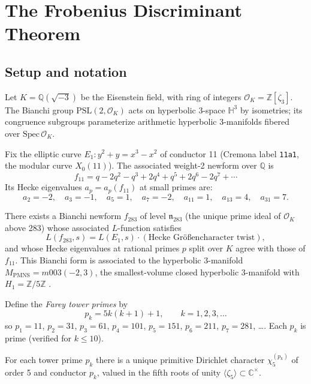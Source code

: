 
\section{The Frobenius Discriminant Theorem}
\label{sec:frobenius}

\subsection{Setup and notation}
\label{subsec:setup}

Let $K = \mathbb{Q}(\sqrt{-3})$ be the Eisenstein field,
with ring of integers $\mathcal{O}_K = \mathbb{Z}[\zeta_3]$.
The Bianchi group $\mathrm{PSL}(2, \mathcal{O}_K)$ acts on
hyperbolic 3-space $\mathbb{H}^3$ by isometries; its congruence
subgroups parameterize arithmetic hyperbolic 3-manifolds fibered
over $\mathrm{Spec}\,\mathcal{O}_K$.

Fix the elliptic curve $E_1 : y^2 + y = x^3 - x^2$ of conductor 11
(Cremona label \texttt{11a1}, the modular curve $X_0(11)$).
The associated weight-2 newform over $\mathbb{Q}$ is
\[
  f_{11} = q - 2q^2 - q^3 + 2q^4 + q^5 + 2q^6 - 2q^7 + \cdots
\]
Its Hecke eigenvalues $a_p = a_p(f_{11})$ at small primes are:
\[
  a_2 = -2,\quad a_3 = -1,\quad a_5 = 1,\quad
  a_7 = -2,\quad a_{11} = 1,\quad a_{13} = 4,\quad a_{31} = 7.
\]

There exists a Bianchi newform $f_{283}$ of level $\mathfrak{n}_{283}$
(the unique prime ideal of $\mathcal{O}_K$ above 283) whose associated
$L$-function satisfies
\[
  L(f_{283}, s) = L(E_1, s) \cdot (\text{Hecke Gr\"o\ss{}encharacter twist}),
\]
and whose Hecke eigenvalues at rational primes $p$ split over $K$
agree with those of $f_{11}$.
This Bianchi form is associated to the hyperbolic 3-manifold
$M_{\mathrm{PMNS}} = m003(-2,3)$, the smallest-volume closed hyperbolic
3-manifold with $H_1 = \mathbb{Z}/5\mathbb{Z}$ \cite{snappy}.

\medskip

Define the \emph{Farey tower primes} by
\[
  p_k = 5k(k+1) + 1, \qquad k = 1, 2, 3, \ldots
\]
so $p_1 = 11$, $p_2 = 31$, $p_3 = 61$, $p_4 = 101$, $p_5 = 151$,
$p_6 = 211$, $p_7 = 281$, \ldots.
Each $p_k$ is prime (verified for $k \leq 10$).

For each tower prime $p_k$ there is a unique primitive Dirichlet character
$\chi_5^{(p_k)}$ of order 5 and conductor $p_k$, valued in the fifth roots
of unity $\langle \zeta_5 \rangle \subset \mathbb{C}^\times$.

